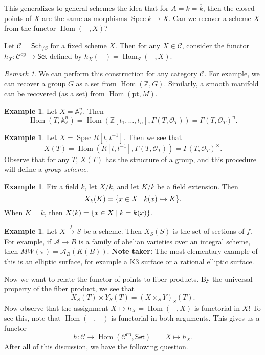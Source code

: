 \documentclass[leqno, openany]{memoir}
\theoremstyle{definition}
\newtheorem{exm}[thm]{Example}
\theoremstyle{remark}
\newtheorem{rmk}[thm]{Remark}
\theoremstyle{plain}
\theoremstyle{definition}
\theoremstyle{remark}
\newcommand{\A}{\mathbb{A}}
\newcommand{\Z}{\mathbb{Z}}
\newcommand{\mc}[1]{\mathcal{#1}}
\newcommand{\mr}[1]{\mathrm{#1}}
\newcommand{\ms}[1]{\mathsf{#1}}
\newcommand{\ol}[1]{\overline{#1}}
\newcommand{\pt}{\mathrm{pt}}
\renewcommand{\op}{\mathrm{op}}
\DeclareMathOperator{\Hom}{Hom}
\DeclareMathOperator{\Spec}{Spec}
\begin{document}
This generalizes to general schemes the idea that for $A = k = \ol{k}$, then the closed points of $X$ are the same as morphisms $\Spec k \to X$. Can we recover a scheme $X$ from the functor $\Hom(-,X)$?

Let $\mc{C} = \ms{Sch}_{/S}$ for a fixed scheme $X$. Then for any $X \in \mc{C}$, consider the functor $h_X \colon \mc{C}^{\mr{op}} \to \ms{Set}$ defined by $h_X(-) = \Hom_S(-,X)$.

\begin{rmk}
    We can perform this construction for any category $\mc{C}$. For example, we can recover a group $G$ as a set from $\Hom(\Z, G)$. Similarly, a smooth manifold can be recovered (as a set) from $\Hom(\pt, M)$.
\end{rmk}

\begin{exm}
    Let $X = \A^n_{\Z}$. Then 
    \[ \Hom(T, \A^n_{\Z}) = \Hom(\Z[t_1, \ldots, t_n], \Gamma(T, \mc{O}_T)) = {\Gamma(T, \mc{O}_T)}^n. \]
\end{exm}

\begin{exm}
    Let $X = \Spec R[t,t^{-1}]$. Then we see that 
    \[ X(T) = \Hom(R[t,t^{-1}], \Gamma(T, \mc{O}_T)) = {\Gamma(T, \mc{O}_T)}^{\times}. \]
    Observe that for any $T$, $X(T)$ has the structure of a group, and this procedure will define a \textit{group scheme}.
\end{exm}

\begin{exm}
    Fix a field $k$, let $X/k$, and let $K/k$ be a field extension. Then 
    \[ X_k(K) = \qty{x \in X \mid k(x) \hookrightarrow K}. \]
    When $K = k$, then $X(k) = \qty{x \in X \mid k = k(x)}$.
\end{exm}

\begin{exm}
    Let $X \xrightarrow{f} S$ be a scheme. Then $X_S(S)$ is the set of sections of $f$. For example, if $\mc{A} \to B$ is a family of abelian varieties over an integral scheme, then $MW(\pi) = \mc{A}_B(K(B))$. \textbf{Note taker:} The most elementary example of this is an elliptic surface, for example a K3 surface or a rational elliptic surface.
\end{exm}

Now we want to relate the functor of points to fiber products. By the universal property of the fiber product, we see that 
\[ X_S(T) \times Y_S(T) = {(X \times_S Y)}_S(T).\]
Now observe that the assignment $X \mapsto h_X = \Hom(-,X)$ is functorial in $X$! To see this, note that $\Hom(-,-)$ is functorial in both arguments. This gives us a functor
\[ h \colon \mc{C} \to \Hom(\mc{C}^{\op}, \ms{Set}) \qquad X \mapsto h_X. \]
After all of this discussion, we have the following question.
\end{document}
